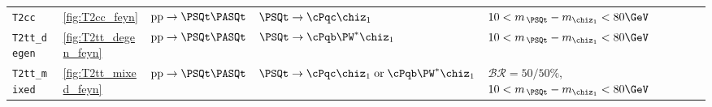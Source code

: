 \begin{table}[tb]
\begin{tabular}{ lllll }
\texttt{T2cc}          & \ref{fig:T2cc_feyn}
                       & $\text{pp}\ra\PSQt\PASQt$      
                       & $\PSQt\ra\cPqc\chiz_1$
                       & $10 < m_{\,\PSQt} - m_{\chiz_1} < 80\GeV$                                      \\ [0.5ex]
\texttt{T2tt\_degen}   & \ref{fig:T2tt_degen_feyn}
                       & $\text{pp}\ra\PSQt\PASQt$      
                       & $\PSQt\ra\cPqb\PW^*\chiz_1$
                       & $10 < m_{\,\PSQt} - m_{\chiz_1} < 80\GeV$                                      \\ [0.5ex]
\texttt{T2tt\_mixed}   & \ref{fig:T2tt_mixed_feyn}
                       & $\text{pp}\ra\PSQt\PASQt$      
                       & $\PSQt\ra\cPqc\chiz_1 \;\text{or}\; \cPqb\PW^*\chiz_1$
                       & $\mathcal{BR} = 50/50\%$, $10 < m_{\,\PSQt} - m_{\chiz_1} < 80\GeV$            \\ [0.5ex]
    \hline
  \end{tabular}
\end{table}

